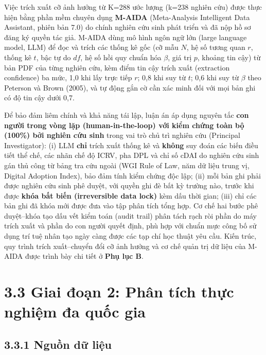 \documentclass[
  a4paper,
  13pt]{extreport}
\begin{document}
Việc trích xuất cỡ ảnh hưởng từ K=288 ước lượng (k=238 nghiên cứu) được
thực hiện bằng phần mềm chuyên dụng \textbf{M-AIDA} (Meta-Analysis
Intelligent Data Assistant, phiên bản 7.0) do chính nghiên cứu sinh phát
triển và đã nộp hồ sơ đăng ký quyền tác giả. M-AIDA dùng mô hình ngôn
ngữ lớn (large language model, LLM) để đọc và trích các thống kê gốc (cỡ
mẫu \(N\), hệ số tương quan \(r\), thống kê \(t\), bậc tự do \(df\), hệ
số hồi quy chuẩn hóa \(\beta\), giá trị \(p\), khoảng tin cậy) từ bản
PDF của từng nghiên cứu, kèm điểm tin cậy trích xuất (extraction
confidence) ba mức, 1,0 khi lấy trực tiếp \(r\); 0,8 khi suy từ \(t\);
0,6 khi suy từ \(\beta\) theo Peterson và Brown (2005), và tự động gắn
cờ cần xác minh đối với mọi bản ghi có độ tin cậy dưới 0,7.

Để bảo đảm liêm chính và khả năng tái lập, luận án áp dụng nguyên tắc
\textbf{con người trong vòng lặp (human-in-the-loop) với kiểm chứng toàn
bộ (100\%) bởi nghiên cứu sinh} trong vai trò chủ trì nghiên cứu
(Principal Investigator): (i) LLM \textbf{chỉ} trích xuất thống kê và
\textbf{không} suy đoán các biến điều tiết thể chế, các nhãn chế độ
ICRV, pha DPL và chỉ số cDAI do nghiên cứu sinh gán thủ công từ bảng tra
cứu ngoài (WGI Rule of Law, năm dữ liệu trung vị, Digital Adoption
Index), bảo đảm tính kiểm chứng độc lập; (ii) mỗi bản ghi phải được
nghiên cứu sinh phê duyệt, với quyền ghi đè bất kỳ trường nào, trước khi
được \textbf{khóa bất biến (irreversible data lock)} kèm dấu thời gian;
(iii) chỉ các bản ghi đã khóa mới được đưa vào tập phân tích tổng hợp.
Cơ chế hai bước phê duyệt--khóa tạo dấu vết kiểm toán (audit trail) phân
tách rạch ròi phần do máy trích xuất và phần do con người quyết định,
phù hợp với chuẩn mực công bố sử dụng trí tuệ nhân tạo ngày càng được
các tạp chí học thuật yêu cầu. Kiến trúc, quy trình trích xuất--chuyển
đổi cỡ ảnh hưởng và cơ chế quản trị dữ liệu của M-AIDA được trình bày
chi tiết ở \textbf{Phụ lục B}.

\hypertarget{giai-ux111oux1ea1n-2-phuxe2n-tuxedch-thux1ef1c-nghiux1ec7m-ux111a-quux1ed1c-gia}{%
\section{3.3 Giai đoạn 2: Phân tích thực nghiệm đa quốc
gia}\label{giai-ux111oux1ea1n-2-phuxe2n-tuxedch-thux1ef1c-nghiux1ec7m-ux111a-quux1ed1c-gia}}

\hypertarget{nguux1ed3n-dux1eef-liux1ec7u}{%
\subsection{3.3.1 Nguồn dữ liệu}\label{nguux1ed3n-dux1eef-liux1ec7u}}
\end{document}
